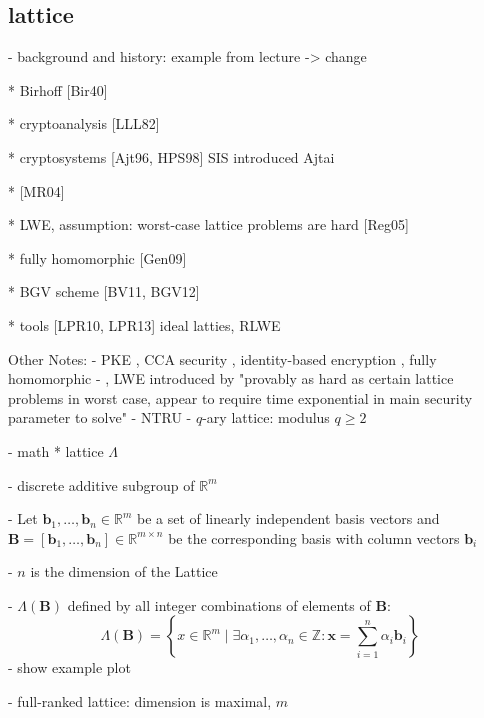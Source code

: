 \documentclass[
  a4paper,  %
  twoside,  %
  bibliography=totoc,
  headsepline,
  cleardoublepage=empty,
  parskip=half,
  draft=false
]{scrbook}
\begin{document}
\subsection{lattice}
- background and history: example from lecture -> change %

  * Birhoff [Bir40]

  * cryptoanalysis [LLL82]

  * cryptosystems [Ajt96, HPS98]
    SIS introduced Ajtai \cite{Ajt96}

  * [MR04]

  * LWE, assumption: worst-case lattice problems are hard [Reg05]

  * fully homomorphic [Gen09]

  * BGV scheme [BV11, BGV12]

  * tools [LPR10, LPR13] ideal latties, RLWE

Other Notes: %
- PKE \cite{AD97, Reg03, Reg05}, CCA security \cite{PW08, Pei09}, identity-based encryption \cite{GPV08, CHKP10, ABB10}, fully homomorphic \cite{Gen09a}
- , LWE introduced by \cite{Reg05} "provably as hard as certain lattice problems in worst case, appear to require time exponential in main security parameter to solve"
- NTRU \cite{HPS98}
- $q$-ary lattice: modulus $q\geq 2$

- math %
  * lattice $\Lambda$ %

    

    - discrete additive subgroup of $\mathbb{R}^m$ %

    - Let $\mathbf{b}_1, \ldots, \mathbf{b}_n \in \mathbb{R}^m$ be a set of linearly independent basis vectors and $\mathbf{B} = \left[\mathbf{b}_1, \ldots, \mathbf{b}_n\right] \in \mathbb{R}^{m\times n}$ be the corresponding basis with column vectors $\mathbf{b}_i$

    - $n$ is the dimension of the Lattice

    - $\Lambda(\mathbf{B})$ defined by all integer combinations of elements of $\mathbf{B}$:
    \begin{equation}
      \Lambda(\mathbf{B}) = \left\{ x \in \mathbb{R}^m \mid \exists \alpha_1, \ldots, \alpha_n \in \mathbb{Z} : \mathbf{x} = \sum_{i=1}^n \alpha_i \mathbf{b}_i \right\}
    \end{equation} 
    - show example plot %

    - full-ranked lattice: dimension is maximal, $m$
\end{document}
